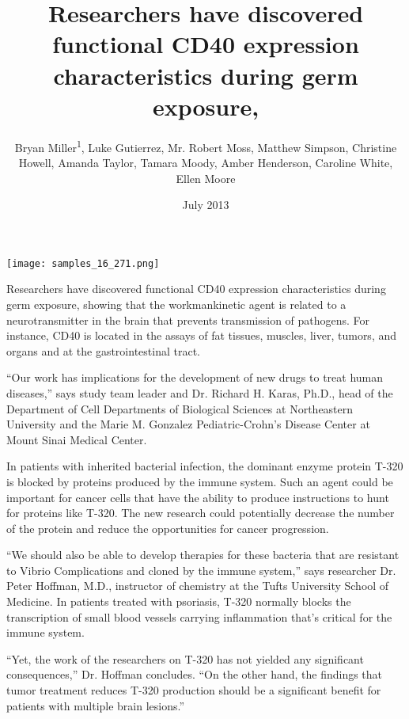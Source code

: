 \documentclass{article}
\title{Researchers have discovered functional CD40 expression characteristics during germ exposure,}
\author{Bryan Miller\textsuperscript{1},  Luke Gutierrez,  Mr. Robert Moss,  Matthew Simpson,  Christine Howell,  Amanda Taylor,  Tamara Moody,  Amber Henderson,  Caroline White,  Ellen Moore}
\affil{\textsuperscript{1}Universiti Teknologi MARA}
\date{July 2013}
\begin{document}
\maketitle

\begin{center}
\begin{minipage}{0.75\linewidth}
\texttt{[image: samples\_16\_271.png]}
\end{minipage}
\end{center}

Researchers have discovered functional CD40 expression characteristics during germ exposure, showing that the workmankinetic agent is related to a neurotransmitter in the brain that prevents transmission of pathogens. For instance, CD40 is located in the assays of fat tissues, muscles, liver, tumors, and organs and at the gastrointestinal tract.

“Our work has implications for the development of new drugs to treat human diseases,” says study team leader and Dr. Richard H. Karas, Ph.D., head of the Department of Cell Departments of Biological Sciences at Northeastern University and the Marie M. Gonzalez Pediatric-Crohn’s Disease Center at Mount Sinai Medical Center.

In patients with inherited bacterial infection, the dominant enzyme protein T-320 is blocked by proteins produced by the immune system. Such an agent could be important for cancer cells that have the ability to produce instructions to hunt for proteins like T-320. The new research could potentially decrease the number of the protein and reduce the opportunities for cancer progression.

“We should also be able to develop therapies for these bacteria that are resistant to Vibrio Complications and cloned by the immune system,” says researcher Dr. Peter Hoffman, M.D., instructor of chemistry at the Tufts University School of Medicine. In patients treated with psoriasis, T-320 normally blocks the transcription of small blood vessels carrying inflammation that’s critical for the immune system.

“Yet, the work of the researchers on T-320 has not yielded any significant consequences,” Dr. Hoffman concludes. “On the other hand, the findings that tumor treatment reduces T-320 production should be a significant benefit for patients with multiple brain lesions.”
\end{document}
